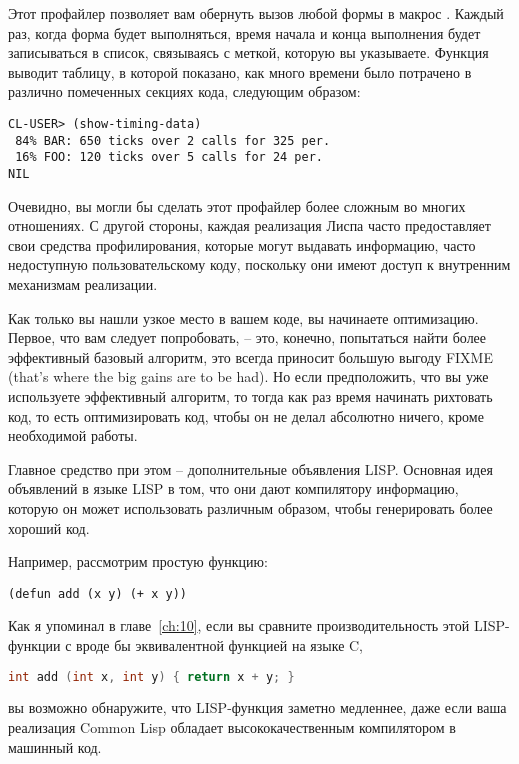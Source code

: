 Этот профайлер позволяет вам обернуть вызов любой формы в макрос
. Каждый раз, когда форма будет выполняться, время начала и конца
выполнения будет записываться в список, связываясь с меткой, которую вы
указываете. Функция  выводит таблицу, в которой показано, как много
времени было потрачено в различно помеченных секциях кода, следующим образом:

\begin{lstlisting}
CL-USER> (show-timing-data)
 84% BAR: 650 ticks over 2 calls for 325 per.
 16% FOO: 120 ticks over 5 calls for 24 per.
NIL
\end{lstlisting}

Очевидно, вы могли бы сделать этот профайлер более сложным во многих отношениях. С другой
стороны, каждая реализация Лиспа часто предоставляет свои средства профилирования, которые
могут выдавать информацию, часто недоступную пользовательскому коду, поскольку они имеют
доступ к внутренним механизмам реализации.

Как только вы нашли узкое место в вашем коде, вы начинаете оптимизацию. Первое, что вам
следует попробовать, -- это, конечно, попытаться найти более эффективный базовый алгоритм,
это всегда приносит большую выгоду FIXME (that's where the big gains are to be had). Но
если предположить, что вы уже используете эффективный алгоритм, то тогда как раз время
начинать рихтовать код, то есть оптимизировать код, чтобы он не делал абсолютно ничего,
кроме необходимой работы.

Главное средство при этом -- дополнительные объявления LISP. Основная идея объявлений в
языке LISP в том, что они дают компилятору информацию, которую он может использовать
различным образом, чтобы генерировать более хороший код.

Например, рассмотрим простую функцию:

\begin{lstlisting}
(defun add (x y) (+ x y))
\end{lstlisting}

Как я упоминал в главе~\ref{ch:10}, если вы сравните производительность этой LISP-функции
с вроде бы эквивалентной функцией на языке C,

\begin{lstlisting}[language=C]
int add (int x, int y) { return x + y; }
\end{lstlisting}

вы возможно обнаружите, что LISP-функция заметно медленнее, даже если ваша реализация
Common Lisp обладает высококачественным компилятором в машинный код.

